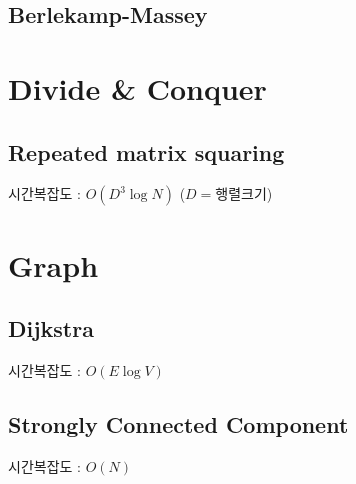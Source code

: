 \documentclass[10pt,landscape,a4paper,twocolumn]{article}
\begin{document}
\subsection{Berlekamp-Massey}




\section{Divide \& Conquer}
\subsection{Repeated matrix squaring}
시간복잡도 : $O(D^3\log{N})$ \hspace{1em} ($D=$행렬크기)



\section{Graph}
\subsection{Dijkstra}
시간복잡도 : $O(E\log{V})$


\subsection{Strongly Connected Component}
시간복잡도 : $O(N)$

\end{document}
